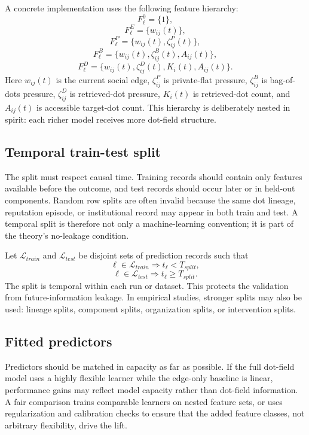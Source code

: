 \documentclass[11pt]{article}
\theoremstyle{remark}
\begin{document}
A concrete implementation uses the following feature hierarchy:
\[
F^0_\ell=\{1\},
\]
\[
F^E_\ell=\{w_{ij}(t)\},
\]
\[
F^P_\ell=\{w_{ij}(t),\zeta_{ij}^{P}(t)\},
\]
\[
F^B_\ell=\{w_{ij}(t),\zeta_{ij}^{B}(t),A_{ij}(t)\},
\]
\[
F^D_\ell=\{w_{ij}(t),\zeta_{ij}^{D}(t),K_i(t),A_{ij}(t)\}.
\]
Here $w_{ij}(t)$ is the current social edge, $\zeta_{ij}^{P}$ is private-flat
pressure, $\zeta_{ij}^{B}$ is bag-of-dots pressure, $\zeta_{ij}^{D}$ is retrieved-dot
pressure, $K_i(t)$ is retrieved-dot count, and $A_{ij}(t)$ is accessible
target-dot count. This hierarchy is deliberately nested in spirit: each richer
model receives more dot-field structure.

\subsection{Temporal train-test split}\label{temporal-train-test-split}

The split must respect causal time. Training records should contain only features available before the outcome, and test records should occur later or in held-out components. Random row splits are often invalid because the same dot lineage, reputation episode, or institutional record may appear in both train and test. A temporal split is therefore not only a machine-learning convention; it is part of the theory's no-leakage condition.


Let $\mathcal L_{train}$ and $\mathcal L_{test}$ be disjoint sets of prediction
records such that
\[
\ell\in \mathcal L_{train} \Rightarrow t_\ell<T_{split},
\]
\[
\ell\in \mathcal L_{test} \Rightarrow t_\ell\geq T_{split}.
\]
The split is temporal within each run or dataset. This protects the validation
from future-information leakage. In empirical studies, stronger splits may also
be used: lineage splits, component splits, organization splits, or intervention
splits.

\subsection{Fitted predictors}\label{fitted-predictors}

Predictors should be matched in capacity as far as possible. If the full dot-field model uses a highly flexible learner while the edge-only baseline is linear, performance gains may reflect model capacity rather than dot-field information. A fair comparison trains comparable learners on nested feature sets, or uses regularization and calibration checks to ensure that the added feature classes, not arbitrary flexibility, drive the lift.
\end{document}
